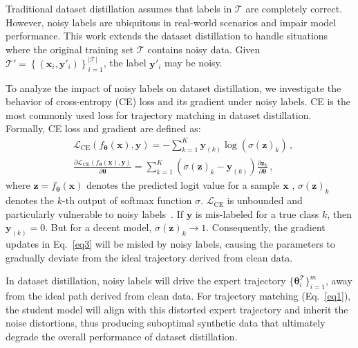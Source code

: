 Traditional dataset distillation assumes that labels in $\mathcal{T}$ are completely correct.
However, noisy labels are ubiquitous in real-world scenarios and impair model performance.
This work extends the dataset distillation to handle situations where the original training set $\mathcal{T}$ contains noisy data. 
Given $\mathcal{T}' = \left\{ \left( \bm{x}_i, \bm{y}'_i \right) \right\}_{i=1}^{|\mathcal{T}|}$, the label $\bm{y}'_i $ may be noisy. 


To analyze the impact of noisy labels on dataset distillation, we investigate the behavior of cross-entropy (CE) loss and its gradient under noisy labels. 
CE is the most commonly used loss for trajectory matching in dataset distillation. Formally, CE loss and gradient are defined as: 
\begin{align}
\label{eq2}
& \mathcal{L}_\text{CE}\left(f_{\boldsymbol{\theta}}(\boldsymbol{x}), \boldsymbol{y}\right) =  -\sum_{k=1}^{K} \boldsymbol{y}_{(k)} \log (\sigma(\boldsymbol{z})_{k})\,, \\
\label{eq3}
& \frac{\partial \mathcal{L}_{\mathrm{CE}}(f_{\boldsymbol{\theta}}(\boldsymbol{x}), \boldsymbol{y})}{\partial \boldsymbol{\theta}} = \sum_{k=1}^{K} (\sigma(\boldsymbol{z})_k - \boldsymbol{y}_{(k)}) \frac{\partial \boldsymbol{z}_k}{\partial \boldsymbol{\theta}} \,,
\end{align}
where $\boldsymbol{z} = f_{\boldsymbol{\theta}}(\boldsymbol{x})$ denotes the predicted logit value for a sample $\boldsymbol{x}$ 
, $\sigma(\boldsymbol{z})_k$ denotes the $k$-th output of softmax function $\sigma$. 
$\mathcal{L}_{\mathrm{CE}}$ is unbounded and particularly vulnerable to noisy labels~\cite{ghosh2017robust, wei2023mitigating}.
If $\boldsymbol{y}$ is mis-labeled for a true class $k$, then $\boldsymbol{y}_{(k)} = 0$. But for a decent model, $\sigma(\boldsymbol{z})_k \rightarrow 1$. 
Consequently, the gradient updates in Eq.~\ref{eq3} will be misled by noisy labels, causing the parameters to gradually deviate from the ideal trajectory derived from clean data.

In dataset distillation, noisy labels will drive the expert trajectory $\{\boldsymbol{\theta}^\mathcal{T}_i\}_{i=1}^{m}$, away from the ideal path derived from clean data. 
For trajectory matching (Eq.~\ref{eq1}), the student model will align with this distorted expert trajectory and inherit the noise distortions, thus producing suboptimal synthetic data that ultimately degrade the overall performance of dataset distillation. 


